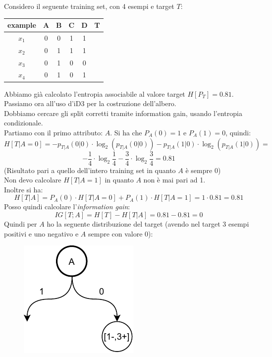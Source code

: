\begin{esercizio}
  Considero il seguente training set, con 4 esempi e target $T$:
  \begin{table}[H]
    \centering
    \begin{tabular}{c|c|c|c|c|c}
      example & A & B & C & D & T\\
      \hline
      $x_1$ & 0 & 0 & 1 & 1 & \color{darkgreen}{1}\\
      $x_2$ & 0 & 1 & 1 & 1 & \color{darkgreen}{1}\\
      $x_3$ & 0 & 1 & 0 & 0 & \color{red}{0}\\
      $x_4$ & 0 & 1 & 0 & 1 & \color{darkgreen}{1}\\
    \end{tabular}
  \end{table}
  Abbiamo già calcolato l'entropia associabile al valore target $H[P_T]=0.81$.\\
  Passiamo ora all'uso d'iD3 per la costruzione dell'albero.\\
  Dobbiamo cercare gli split corretti tramite information gain, usando
  l'entropia condizionale.\\
  Partiamo con il primo attributo: $A$. Si ha che $P_A(0)=1$ e $P_A(1)=0$,
  quindi:
  \[H[T|A=0]=-p_{T|A}(0|0)\cdot \log_2(p_{T|A}(0|0))-p_{T|A}(1|0)\cdot
    \log_2(p_{T|A}(1|0))=\]
  \[-\frac{1}{4}\cdot\log_2\frac{1}{4}-
    \frac{3}{4}\cdot\log_2\frac{3}{4}=0.81\]
  (Risultato pari a quello dell'intero training set in quanto $A$ è sempre 0)\\
  Non devo calcolare $H[T|A=1]$ in quanto $A$ non è mai pari ad 1.\\
  Inoltre si ha:
  \[H[T|A]=P_A(0)\cdot H[T|A=0]+P_A(1)\cdot H[T|A=1]=1\cdot 0.81=0.81\]
  Posso quindi calcolare l'\textit{information gain}:
  \[IG[T;A]=H[T]-H[T|A]=0.81-0.81=0\]
  Quindi per $A$ ho la seguente distribuzione del target (avendo nel target 3
  esempi positivi e uno negativo e $A$ sempre con valore 0):
  \begin{figure}[H]
    \centering
    \includegraphics[scale = 0.9]{img/id1.pdf}

\end{figure}
\end{esercizio}
